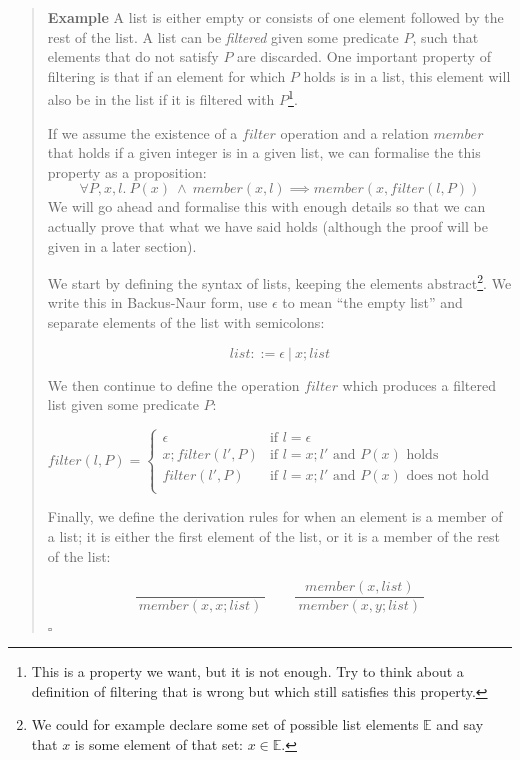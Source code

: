 \documentclass{tufte-handout}
\newcounter{example}
\newenvironment{example}
{\refstepcounter{example}\begin{quote}
\textbf{Example \arabic{example}}}
{

$\square$\end{quote}}
\begin{document}
\begin{example}\label{ex:filter}
  A list is either empty or consists of one element followed by
  the rest of the list. A list can be \emph{filtered} given some
  predicate $P$, such that elements that do not satisfy $P$ are
  discarded. One important property of filtering is that if an
  element for which $P$ holds is in a list, this element will also
  be in the list if it is filtered with $P$\footnote{This is a
    property we want, but it is not enough. Try to think about a
    definition of filtering that is wrong but which still
    satisfies this property. }.

  If we assume the existence of a $\mathit{filter}$ operation and
  a relation $\mathit{member}$ that holds if a given integer is in
  a given list, we can formalise the this property as a
  proposition:
  \[
    \forall P, x, l.~P(x) ~\land~ \mathit{member}(x, l)
    \implies
    \mathit{member}(x, \mathit{filter}(l, P))
  \]
  We will go ahead and formalise this with enough details so that
  we can actually prove that what we have said holds (although
  the proof will be given in a later section).

  We start by defining the syntax of lists, keeping the elements
  abstract\footnote{We could for example declare some set of
    possible list elements $\mathbb{E}$ and say that $x$ is some
    element of that set: $x \in \mathbb{E}$.}. We write this in
  Backus-Naur form, use $\epsilon$ to mean ``the empty list'' and
  separate elements of the list with semicolons:

  \[
      \mathit{list} ::= \epsilon ~|~ x; \mathit{list}
  \]

  \noindent
  We then continue to define the operation $\mathit{filter}$ which
  produces a filtered list given some predicate $P$:

  $\mathit{filter(l, P)} =
  \begin{cases}
    \epsilon & \text{if } l = \epsilon\\
    x; \mathit{filter}(l', P) & \text{if } l = x; l' \text{ and } P(x) \text{ holds}\\
    \mathit{filter}(l', P) & \text{if } l = x; l' \text{ and } P(x) \text{ does not hold}\\
  \end{cases}$

  \noindent
  Finally, we define the derivation rules for when an element is a
  member of a list; it is either the first element of the list, or
  it is a member of the rest of the list:

  \[
    \frac{}{~\mathit{member}(x, x; \mathit{list})~}
    \qquad
    \frac{~\mathit{member}(x, \mathit{list})~}{~\mathit{member}(x, y; \mathit{list})~}
  \]

\end{example}
\end{document}
